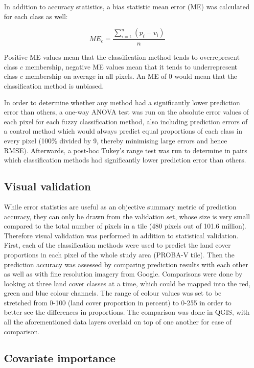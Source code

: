 \documentclass[a4paper,12pt]{scrbook}
\begin{document}
In addition to accuracy statistics, a bias statistic mean error (ME) was calculated for each class as well:

$$ ME_c = \frac{\displaystyle\sum_{i=1}^{n}{ (p_{i} - v_{i}) }}{n} $$

Positive ME values mean that the classification method tends to overrepresent class $c$ membership, negative ME values mean that it tends to underrepresent class $c$ membership on average in all pixels. An ME of 0 would mean that the classification method is unbiased.

In order to determine whether any method had a significantly lower prediction error than others, a one-way ANOVA test was run on the absolute error values of each pixel for each fuzzy classification method, also including prediction errors of a control method which would always predict equal proportions of each class in every pixel (100\% divided by 9, thereby minimising large errors and hence RMSE). Afterwards, a post-hoc Tukey's range test \citep{tukey1949hsd} was run to determine in pairs which classification methods had significantly lower prediction error than others. 

\subsection{Visual validation}

While error statistics are useful as an objective summary metric of prediction accuracy, they can only be drawn from the validation set, whose size is very small compared to the total number of pixels in a tile (480 pixels out of 101.6 million). Therefore visual validation was performed in addition to statistical validation. First, each of the classification methods were used to predict the land cover proportions in each pixel of the whole study area (PROBA-V tile). Then the prediction accuracy was assessed by comparing prediction results with each other as well as with fine resolution imagery from Google. Comparisons were done by looking at three land cover classes at a time, which could be mapped into the red, green and blue colour channels. The range of colour values was set to be stretched from 0-100 (land cover proportion in percent) to 0-255 in order to better see the differences in proportions. The comparison was done in QGIS, with all the aforementioned data layers overlaid on top of one another for ease of comparison.

\subsection{Covariate importance}
\end{document}
